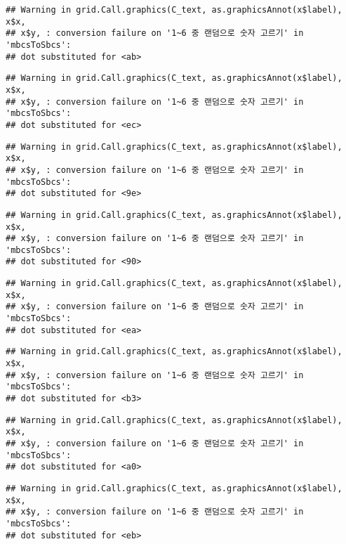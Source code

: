 \documentclass[]{book}
\begin{document}
\begin{verbatim}
## Warning in grid.Call.graphics(C_text, as.graphicsAnnot(x$label), x$x,
## x$y, : conversion failure on '1~6 중 랜덤으로 숫자 고르기' in 'mbcsToSbcs':
## dot substituted for <ab>
\end{verbatim}

\begin{verbatim}
## Warning in grid.Call.graphics(C_text, as.graphicsAnnot(x$label), x$x,
## x$y, : conversion failure on '1~6 중 랜덤으로 숫자 고르기' in 'mbcsToSbcs':
## dot substituted for <ec>
\end{verbatim}

\begin{verbatim}
## Warning in grid.Call.graphics(C_text, as.graphicsAnnot(x$label), x$x,
## x$y, : conversion failure on '1~6 중 랜덤으로 숫자 고르기' in 'mbcsToSbcs':
## dot substituted for <9e>
\end{verbatim}

\begin{verbatim}
## Warning in grid.Call.graphics(C_text, as.graphicsAnnot(x$label), x$x,
## x$y, : conversion failure on '1~6 중 랜덤으로 숫자 고르기' in 'mbcsToSbcs':
## dot substituted for <90>
\end{verbatim}

\begin{verbatim}
## Warning in grid.Call.graphics(C_text, as.graphicsAnnot(x$label), x$x,
## x$y, : conversion failure on '1~6 중 랜덤으로 숫자 고르기' in 'mbcsToSbcs':
## dot substituted for <ea>
\end{verbatim}

\begin{verbatim}
## Warning in grid.Call.graphics(C_text, as.graphicsAnnot(x$label), x$x,
## x$y, : conversion failure on '1~6 중 랜덤으로 숫자 고르기' in 'mbcsToSbcs':
## dot substituted for <b3>
\end{verbatim}

\begin{verbatim}
## Warning in grid.Call.graphics(C_text, as.graphicsAnnot(x$label), x$x,
## x$y, : conversion failure on '1~6 중 랜덤으로 숫자 고르기' in 'mbcsToSbcs':
## dot substituted for <a0>
\end{verbatim}

\begin{verbatim}
## Warning in grid.Call.graphics(C_text, as.graphicsAnnot(x$label), x$x,
## x$y, : conversion failure on '1~6 중 랜덤으로 숫자 고르기' in 'mbcsToSbcs':
## dot substituted for <eb>
\end{verbatim}
\end{document}
